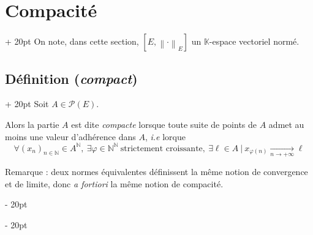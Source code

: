 \documentclass[a4paper, 12pt, twoside]{article}
\newcommand{\N}{\mathbb{N}} %
\newcommand{\K}{\mathbb K}
\newcommand{\tendsto}[1]{\xrightarrow[#1]{}}
\newcommand{\lr}[1]{\left( #1 \right)}
\newcommand{\norm}[1]{\left\lVert #1 \right\rVert}
\newcommand{\ind}[1][20pt]{\advance\leftskip + #1}
\newcommand{\deind}[1][20pt]{\advance\leftskip - #1}
\newenvironment{indt}[2][20pt]{#2 \par \ind[#1]}{\par \deind} %
\begin{document}
    \vspace{12pt}
    
    \begin{indt}{\section{Compacité}}
        On note, dans cette section, $[E, \norm \cdot _E]$ un $\K$-espace vectoriel normé.

        \begin{indt}{\subsection{Définition (\textit{compact})}}
            Soit $A \in \mathcal P(E)$.

            Alors la partie $A$ est dite \emph{compacte} lorsque toute suite de points de $A$ admet au moins une valeur d'adhérence dans $A$, \textit{i.e} lorque
            \[
                \forall \lr{x_n}_{n \in \N} \in A^\N,\
                \exists \varphi \in \N^\N\ \text{strictement croissante},\
                \exists \ell \in A\ |\
                x_{\varphi(n)} \tendsto{n \to +\infty} \ell
            \]

            \vspace{6pt}
            
            Remarque : deux normes équivalentes définissent la même notion de convergence et de limite, donc \textit{a fortiori} la même notion de compacité.
        \end{indt}
    \end{indt}
    
\end{document}
